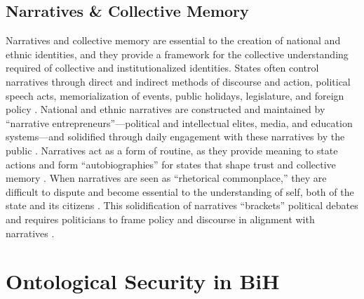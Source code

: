 \subsection{Narratives \& Collective Memory}
\label{subsec:narrative}

Narratives and collective memory are essential to the creation of national and ethnic identities, and they provide a framework for the collective understanding required of collective and institutionalized identities. States often control narratives through direct and indirect methods of discourse and action, political speech acts, memorialization of events, public holidays, legislature, and foreign policy \citep[pg.~615-617]{subotic2015}. National and ethnic narratives are constructed and maintained by ``narrative entrepreneurs''---political and intellectual elites, media, and education systems---and solidified through daily engagement with these narratives by the public \citep[pg.~615]{subotic2015}. Narratives act as a form of routine, as they provide meaning to state actions and form ``autobiographies'' for states that shape trust and collective memory \citep[pg.~614]{subotic2015}. When narratives are seen as ``rhetorical commonplace,'' they are difficult to dispute and become essential to the understanding of self, both of the state and its citizens \citep[pg.~615]{subotic2015}. This solidification of narratives ``brackets'' political debates and requires politicians to frame policy and discourse in alignment with narratives \citep[pg.~615-616]{subotic2015}.



\section{Ontological Security in BiH}
\label{sec:ont_BiH}

